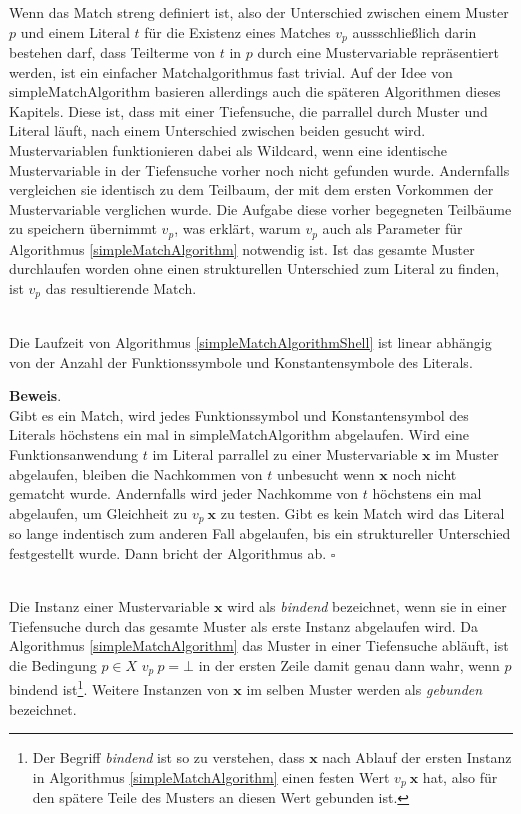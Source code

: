 Wenn das Match streng definiert ist, also der Unterschied zwischen einem Muster $p$ und einem Literal $t$ für die Existenz eines Matches $v_p$ aussschließlich darin bestehen darf, dass Teilterme von $t$ in $p$ durch eine Mustervariable repräsentiert werden, ist ein einfacher Matchalgorithmus fast trivial. Auf der Idee von $\mathrm{simpleMatchAlgorithm}$ basieren allerdings auch die späteren Algorithmen dieses Kapitels. Diese ist, dass mit einer Tiefensuche, die parrallel durch Muster und Literal läuft, nach einem Unterschied zwischen beiden gesucht wird. Mustervariablen funktionieren dabei als Wildcard, wenn eine identische Mustervariable in der Tiefensuche vorher noch nicht gefunden wurde. Andernfalls vergleichen sie identisch zu dem Teilbaum, der mit dem ersten Vorkommen der Mustervariable verglichen wurde. Die Aufgabe diese vorher begegneten Teilbäume zu speichern übernimmt $v_p$, was erklärt, warum $v_p$ auch als Parameter für Algorithmus \ref{simpleMatchAlgorithm} notwendig ist. Ist das gesamte Muster durchlaufen worden ohne einen strukturellen Unterschied zum Literal zu finden, ist $v_p$ das resultierende Match.\\

\begin{lemma}~\\
Die Laufzeit von Algorithmus \ref{simpleMatchAlgorithmShell} ist linear abhängig von der Anzahl der Funktionssymbole und Konstantensymbole des Literals.
\end{lemma}

\textbf{Beweis}.\\
Gibt es ein Match, wird jedes Funktionssymbol und Konstantensymbol des Literals höchstens ein mal in simpleMatchAlgorithm abgelaufen. Wird eine Funktionsanwendung $t$ im Literal parrallel zu einer Mustervariable $\mathbf x$ im Muster abgelaufen, bleiben die Nachkommen von $t$ unbesucht wenn $\mathbf x$ noch nicht gematcht wurde. Andernfalls wird jeder Nachkomme von $t$ höchstens ein mal abgelaufen, um Gleichheit zu $v_p~\mathbf x$ zu testen.
Gibt es kein Match wird das Literal so lange indentisch zum anderen Fall abgelaufen, bis ein struktureller Unterschied festgestellt wurde. Dann bricht der Algorithmus ab.
\hfill $\square$\\


\begin{definition}~\\
Die Instanz einer Mustervariable $\mathbf x$ wird als \emph{bindend}  bezeichnet, wenn sie in einer Tiefensuche durch das gesamte Muster als erste Instanz abgelaufen wird. Da Algorithmus \ref{simpleMatchAlgorithm} das Muster in einer Tiefensuche abläuft, ist die Bedingung $p \in X$ \KwAnd $v_p~p = \bot$ in der ersten Zeile damit genau dann wahr, wenn $p$ bindend ist\footnote{Der Begriff \emph{bindend} ist so zu verstehen, dass $\mathbf x$ nach Ablauf der ersten Instanz in Algorithmus \ref{simpleMatchAlgorithm} einen festen Wert $v_p~\mathbf x$ hat, also für den spätere Teile des Musters an diesen Wert gebunden ist.}. Weitere Instanzen von $\mathbf x$ im selben Muster werden als \emph{gebunden} bezeichnet.
\end{definition}


